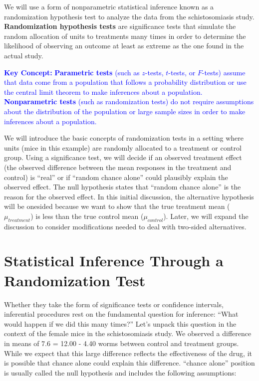 \documentclass[
]{book}
\begin{document}
We will use a form of nonparametric statistical inference known as a randomization hypothesis test to analyze the data from the schistosomiasis study. \textbf{Randomization hypothesis tests} are significance tests that simulate the random allocation of units to treatments many times in order to determine the likelihood of observing an outcome at least as extreme as the one found in the actual study.

\textbf{\textcolor{blue}{Key Concept:}}
\textcolor{blue}{\textbf{Parametric tests} (such as $z$-tests, $t$-tests, or $F$-tests) assume that data come from a population that follows a probability distribution or use the central limit theorem to make inferences about a population. \textbf{Nonparametric tests} (such as randomization tests) do not require assumptions about the distribution of the population or large sample sizes in order to make inferences about a population.}

We will introduce the basic concepts of randomization tests in a setting where units (mice in this example) are randomly allocated to a treatment or control group. Using a significance test, we will decide if an observed treatment effect (the observed difference between the mean responses in the treatment and control) is ``real'' or if ``random chance alone'' could plausibly explain the observed effect. The null hypothesis states that ``random chance alone'' is the reason for the observed effect. In this initial discussion, the alternative hypothesis will be onesided because we want to show that the true treatment mean (\(\mu_{treatment}\)) is less than the true control mean (\(\mu_{control}\)). Later, we will expand the discussion to consider modifications needed to deal with two-sided alternatives.

\hypertarget{statistical-inference-through-a-randomization-test}{%
\section{Statistical Inference Through a Randomization Test}\label{statistical-inference-through-a-randomization-test}}

Whether they take the form of significance tests or confidence intervals, inferential procedures rest on the fundamental question for inference: ``What would happen if we did this many times?'' Let's unpack this question in the context of the female mice in the schistosomiasis study. We observed a difference in means of 7.6 = 12.00 - 4.40 worms between control and treatment groups. While we expect that this large difference reflects the effectiveness of the drug, it is possible that chance alone could explain this difference. ``chance alone'' position is usually called the null hypothesis and includes the following assumptions:
\end{document}
